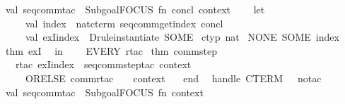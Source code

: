 \begin{isabellebody}
\isanewline
val\ seq{}comm{}{}tac\ {}\ Subgoal{}FOCUS\ {}fn\ {}concl{}\ context{}\ {}{}{}{}\ {}{}\isanewline
\ \ let\isanewline
\ \ \ \ val\ index\ {}\ nat{}cterm\ {}seq{}comm{}get{}index\ concl{}\isanewline
\ \ \ \ val\ exI{}index\ {}\ Drule{}instantiate{}\ {}SOME\ %
\isaantiq
ctyp\ {}nat{}{}%
\endisaantiq
{}\ {}NONE{}\ SOME\ index{}\ %
\isaantiq
thm\ exI{}%
\endisaantiq
\isanewline
\ \ in\isanewline
\ \ \ \ EVERY\ {}rtac\ %
\isaantiq
thm\ comm{}step{}%
\endisaantiq
\ {}{}\ rtac\ exI{}index\ {}{}\ seq{}comm{}step{}tac\ context\ {}{}\isanewline
\ \ \ \ ORELSE\ commr{}tac\ {}\ {}\ {}\ context\ {}\isanewline
\ \ end\isanewline
\ \ handle\ CTERM\ {}\ {}{}\ no{}tac{}\isanewline
\isanewline
val\ seq{}comm{}tac\ {}\ Subgoal{}FOCUS\ {}fn\ {}context{}\ {}{}{}{}\ {}{}\isanewline

\end{isabellebody}
